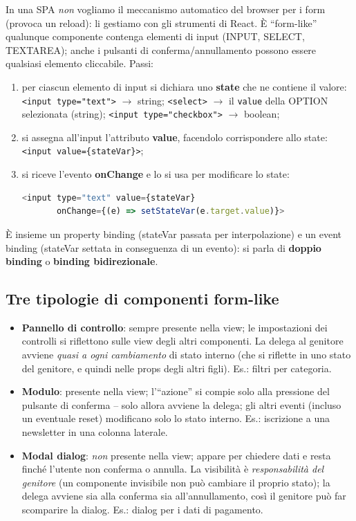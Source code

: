 In una SPA \emph{non} vogliamo il meccanismo automatico del browser per i form (provoca un
reload): li gestiamo con gli strumenti di React. \`E ``form-like'' qualunque componente
contenga elementi di input (INPUT, SELECT, TEXTAREA); anche i pulsanti di
conferma/annullamento possono essere qualsiasi elemento cliccabile. Passi:
\begin{enumerate}
  \item per ciascun elemento di input si dichiara uno \textbf{state} che ne contiene il
        valore: \texttt{<input type="text">} $\rightarrow$ string;
        \texttt{<select>} $\rightarrow$ il \texttt{value} della OPTION selezionata (string);
        \texttt{<input type="checkbox">} $\rightarrow$ boolean;
  \item si assegna all'input l'attributo \textbf{value}, facendolo corrispondere allo
        state: \texttt{<input value=\{stateVar\}>};
  \item si riceve l'evento \textbf{onChange} e lo si usa per modificare lo state:
\begin{lstlisting}[language=JavaScript]
<input type="text" value={stateVar}
       onChange={(e) => setStateVar(e.target.value)}>
\end{lstlisting}
\end{enumerate}
\`E insieme un property binding (stateVar passata per interpolazione) e un event binding
(stateVar settata in conseguenza di un evento): si parla di \textbf{doppio binding} o
\textbf{binding bidirezionale}.

\subsection{Tre tipologie di componenti form-like}
\begin{itemize}
  \item \textbf{Pannello di controllo}: sempre presente nella view; le impostazioni dei
        controlli si riflettono sulle view degli altri componenti. La delega al genitore
        avviene \emph{quasi a ogni cambiamento} di stato interno (che si riflette in uno
        stato del genitore, e quindi nelle props degli altri figli). Es.: filtri per
        categoria.
  \item \textbf{Modulo}: presente nella view; l'``azione'' si compie solo alla pressione del
        pulsante di conferma -- solo allora avviene la delega; gli altri eventi (incluso un
        eventuale reset) modificano solo lo stato interno. Es.: iscrizione a una newsletter
        in una colonna laterale.
  \item \textbf{Modal dialog}: \emph{non} presente nella view; appare per chiedere dati e
        resta finch\'e l'utente non conferma o annulla. La visibilit\`a \`e
        \emph{responsabilit\`a del genitore} (un componente invisibile non pu\`o cambiare il
        proprio stato); la delega avviene sia alla conferma sia all'annullamento, cos\`i il
        genitore pu\`o far scomparire la dialog. Es.: dialog per i dati di pagamento.
\end{itemize}

